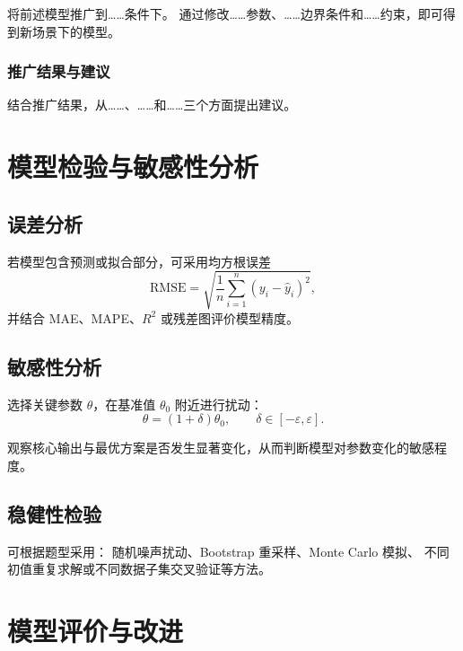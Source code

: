 \documentclass[UTF8,fontset=windows,a4paper,12pt]{ctexart}
\begin{document}
将前述模型推广到……条件下。
通过修改……参数、……边界条件和……约束，即可得到新场景下的模型。

\subsubsection{推广结果与建议}

结合推广结果，从……、……和……三个方面提出建议。

\section{模型检验与敏感性分析}

\subsection{误差分析}

若模型包含预测或拟合部分，可采用均方根误差
\begin{equation}
  \mathrm{RMSE}
  = \sqrt{
      \frac{1}{n}
      \sum_{i=1}^{n}
      (y_i-\hat y_i)^2
    },
  \label{eq:rmse}
\end{equation}
并结合 MAE、MAPE、$R^2$ 或残差图评价模型精度。


\subsection{敏感性分析}

选择关键参数 $\theta$，在基准值 $\theta_0$ 附近进行扰动：
\begin{equation}
  \theta=(1+\delta)\theta_0,
  \qquad
  \delta\in[-\varepsilon,\varepsilon].
\end{equation}

观察核心输出与最优方案是否发生显著变化，从而判断模型对参数变化的敏感程度。

\subsection{稳健性检验}

可根据题型采用：
随机噪声扰动、Bootstrap 重采样、Monte Carlo 模拟、
不同初值重复求解或不同数据子集交叉验证等方法。

\section{模型评价与改进}
\end{document}
